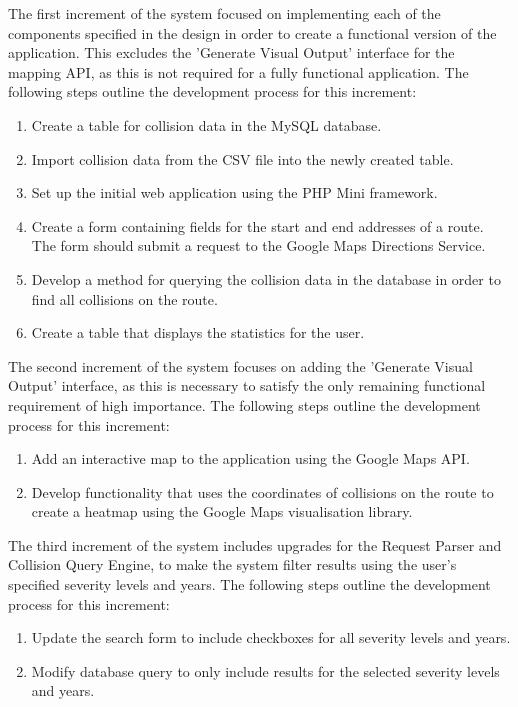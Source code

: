 \documentclass[authoryearcitations]{UoYCSproject}
\begin{document}
The first increment of the system focused on implementing each of the components specified in the design in order to create a functional version of the application. This excludes the 'Generate Visual Output' interface for the mapping API, as this is not required for a fully functional application. The following steps outline the development process for this increment:

\begin{enumerate}
	\item Create a table for collision data in the MySQL database.
	\item Import collision data from the CSV file into the newly created table.
	\item Set up the initial web application using the PHP Mini framework.
	\item Create a form containing fields for the start and end addresses of a route. The form should submit a request to the Google Maps Directions Service.
	\item Develop a method for querying the collision data in the database in order to find all collisions on the route.
	\item Create a table that displays the statistics for the user.
\end{enumerate}

The second increment of the system focuses on adding the 'Generate Visual Output' interface, as this is necessary to satisfy the only remaining functional requirement of high importance. The following steps outline the development process for this increment:
\begin{enumerate}
	\item Add an interactive map to the application using the Google Maps API.
	\item Develop functionality that uses the coordinates of collisions on the route to create a heatmap using the Google Maps visualisation library.
\end{enumerate}

The third increment of the system includes upgrades for the Request Parser and Collision Query Engine, to make the system filter results using the user's specified severity levels and years. The following steps outline the development process for this increment:
\begin{enumerate}
	\item Update the search form to include checkboxes for all severity levels and years.
	\item Modify database query to only include results for the selected severity levels and years.
\end{enumerate}
\end{document}
